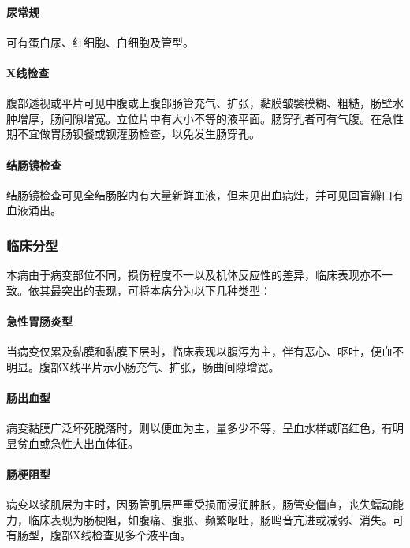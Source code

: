 \paragraph{尿常规}

可有蛋白尿、红细胞、白细胞及管型。

\paragraph{X线检查}

腹部透视或平片可见中腹或上腹部肠管充气、扩张，黏膜皱襞模糊、粗糙，肠壁水肿增厚，肠间隙增宽。立位片中有大小不等的液平面。肠穿孔者可有气腹。在急性期不宜做胃肠钡餐或钡灌肠检查，以免发生肠穿孔。

\paragraph{结肠镜检查}

结肠镜检查可见全结肠腔内有大量新鲜血液，但未见出血病灶，并可见回盲瓣口有血液涌出。

\subsubsection{临床分型}

本病由于病变部位不同，损伤程度不一以及机体反应性的差异，临床表现亦不一致。依其最突出的表现，可将本病分为以下几种类型：

\paragraph{急性胃肠炎型}

当病变仅累及黏膜和黏膜下层时，临床表现以腹泻为主，伴有恶心、呕吐，便血不明显。腹部X线平片示小肠充气、扩张，肠曲间隙增宽。

\paragraph{肠出血型}

病变黏膜广泛坏死脱落时，则以便血为主，量多少不等，呈血水样或暗红色，有明显贫血或急性大出血体征。

\paragraph{肠梗阻型}

病变以浆肌层为主时，因肠管肌层严重受损而浸润肿胀，肠管变僵直，丧失蠕动能力，临床表现为肠梗阻，如腹痛、腹胀、频繁呕吐，肠鸣音亢进或减弱、消失。可有肠型，腹部X线检查见多个液平面。

